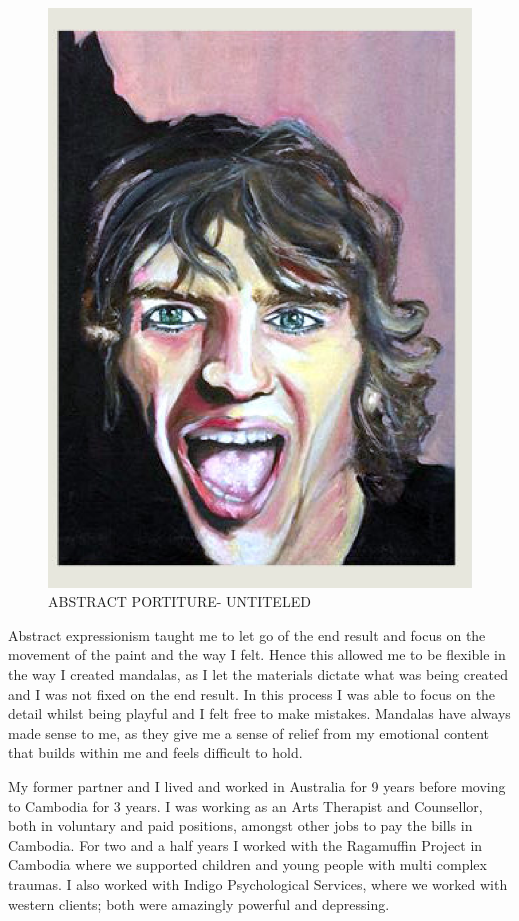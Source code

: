 \begin{figure}[htbp]
\begin{center}
\includegraphics[scale=.50]{../eps/face.eps} 
\caption{ABSTRACT PORTITURE- UNTITELED}
\label{label}
\end{center}
\end{figure}

Abstract expressionism taught me to let go of the end result and focus on the movement of the paint and the way I felt. Hence this allowed me to be flexible in the way I created mandalas, as I let the materials dictate what was being created and I was not fixed on the end result. In this process I was able to focus on the detail whilst being playful and I felt free to make mistakes. Mandalas have always made sense to me, as they give me a sense of relief from my emotional content that builds within me and feels difficult to hold.

My former partner and I lived and worked in Australia for 9 years before moving to Cambodia for 3 years. I was working as an Arts Therapist and Counsellor, both in voluntary and paid positions, amongst other jobs to pay the bills in Cambodia. For two and a half years I worked with the Ragamuffin Project in Cambodia where we supported children and young people with multi complex traumas. I also worked with Indigo Psychological Services, where we worked with western clients; both were amazingly powerful and depressing. 

